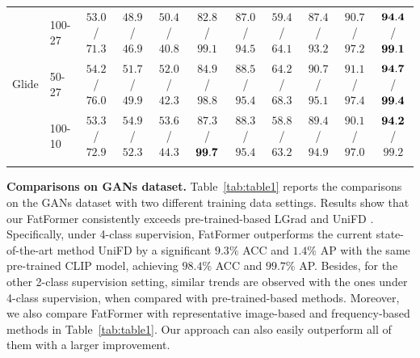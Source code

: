 \documentclass[10pt,twocolumn,letterpaper]{article}
\begin{document}
\begin{table}[!ht]
{\begin{tabular}{cl|cccccccc|c}
\multirow{3}{*}{Glide} & 100-27   & $53.0$ / $71.3$ & $48.9$ / $46.9$ & $50.4$ / $40.8$ & $82.8$ / $99.1$ & $87.0$ / $94.5$ & $59.4$ / $64.1$ & $87.4$ / $93.2$ & $90.7$ / $97.2$ & $\bf 94.4$ / $\bf 99.1$ \\
                                              & 50-27    & $54.2$ / $76.0$ & $51.7$ / $49.9$ & $52.0$ / $42.3$ & $84.9$ / $98.8$ & $88.5$ / $95.4$ & $64.2$ / $68.3$ & $90.7$ / $95.1$ & $91.1$ / $97.4$ & $\bf 94.7$ / $\bf 99.4$ \\
                                              & 100-10   & $53.3$ / $72.9$ & $54.9$ / $52.3$ & $53.6$ / $44.3$ & $87.3$ / $\bf 99.7$ & $88.3$ / $95.4$ & $58.8$ / $63.2$ & $89.4$ / $94.9$ & $90.1$ / $97.0$ & $\bf 94.2$ / $99.2$ \\
\hline
\multicolumn{2}{c|}{\cellcolor{lightgray!20}{Mean}}        & \cellcolor{lightgray!20}{$52.4$ / $70.1$} & \cellcolor{lightgray!20}{$51.7$ / $51.8$} & \cellcolor{lightgray!20}{$53.2$ / $50.2$} & \cellcolor{lightgray!20}{$84.5$ / $97.8$} & \cellcolor{lightgray!20}{$80.6$ / $89.2$} & \cellcolor{lightgray!20}{$57.6$ / $60.0$} & \cellcolor{lightgray!20}{$89.4$ / $97.7$} & \cellcolor{lightgray!20}{$85.4$ / $94.6$} & \cellcolor{lightgray!20}{$\bf 95.0$ / $\bf 98.8$} \\
\end{tabular}}
\label{tab:table2}
\vspace{-3mm}
\end{table}

\noindent \textbf{Comparisons on GANs dataset.}
Table~\ref{tab:table1} reports the comparisons on the GANs dataset \cite{wang2020cnn} with two different training data settings. Results show that our FatFormer consistently exceeds pre-trained-based LGrad \cite{tan2023learning} and UniFD \cite{ojha2023towards}. Specifically, under 4-class supervision, FatFormer outperforms the current state-of-the-art method UniFD by a significant $9.3\%$ ACC and $1.4\%$ AP with the same pre-trained CLIP model, achieving $98.4\%$ ACC and $99.7\%$ AP. Besides, for the other 2-class supervision setting, similar trends are observed with the ones under 4-class supervision, when compared with pre-trained-based methods. Moreover, we also compare FatFormer with representative image-based \cite{wang2020cnn,chai2020makes,shiohara2022detecting} and frequency-based methods \cite{durall2020watch,frank2020leveraging,qian2020thinking,jeong2022bihpf,jeong2022frepgan} in Table~\ref{tab:table1}. Our approach can also easily outperform all of them with a larger improvement.
\end{document}
